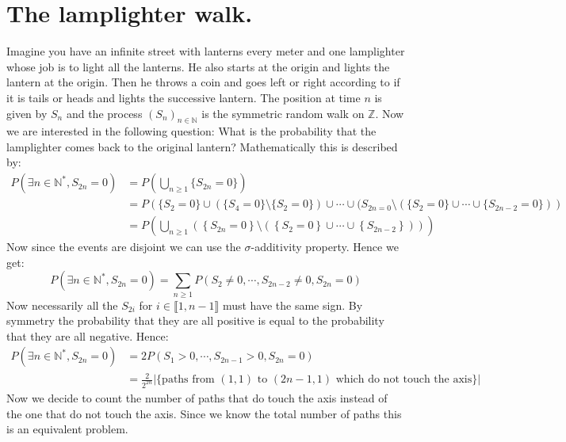 \documentclass[10pt,a4paper]{book}
\theoremstyle{definition}
\begin{document}
\section{The lamplighter walk.}
Imagine you have an infinite street with lanterns every meter and one lamplighter whose job is to light all the lanterns. He also starts at the origin and lights the lantern at the origin. Then he throws a coin and goes left or right according to if it is tails or heads and lights the successive lantern. The position at time $n$ is given by $S_n$ and the process $(S_n)_{n \in \mathbb{N}}$ is the symmetric random walk on $\mathbb{Z}$. Now we are interested in the following question: What is the probability that the lamplighter comes back to the original lantern? Mathematically this is described by:
\begin{align*}
P(\exists n \in \mathbb{N}^*, S_{2n} = 0) &= P\left(\bigcup_{n \geq 1} \{ S_{2n} = 0 \} \right) \\
&= P\left(\{S_2 = 0\} \cup (\{S_4 = 0\}\setminus\{S_2 = 0\}) \cup \cdots \cup (S_{2n = 0} \setminus (\{S_2 = 0\} \cup \cdots \cup \{S_{2n - 2} = 0\} )\right)\\
&= P\left(\bigcup_{n \geq 1} \left( \left\{S_{2n} = 0\right\} \setminus \left( \left\{S_2 = 0\right\} \cup \cdots \cup \left\{ S_{2n - 2} \right\} \right) \right)\right)
\end{align*}
Now since the events are disjoint we can use the $\sigma$-additivity property. Hence we get:
\[
P(\exists n \in \mathbb{N}^*, S_{2n} = 0) = \sum_{n \geq 1} P(S_2 \neq 0, \cdots, S_{2n - 2} \neq 0, S_{2n} = 0)
\]
Now necessarily all the $S_{2i}$ for $i \in \llbracket 1, n-1\rrbracket$ must have the same sign. By symmetry the probability that they are all positive is equal to the probability that they are all negative. Hence:
\begin{align*}
P(\exists n \in \mathbb{N}^*, S_{2n} = 0) &= 2 P(S_1 > 0, \cdots, S_{2n-1} > 0, S_{2n} = 0) \\
&= \frac{2}{2^{2n}} |\{ \text{paths from } (1, 1) \text{ to } (2n -1, 1) \text{ which do not touch the axis} \}|
\end{align*}
Now we decide to count the number of paths that do touch the axis instead of the one that do not touch the axis. Since we know the total number of paths this is an equivalent problem. 
\end{document}
